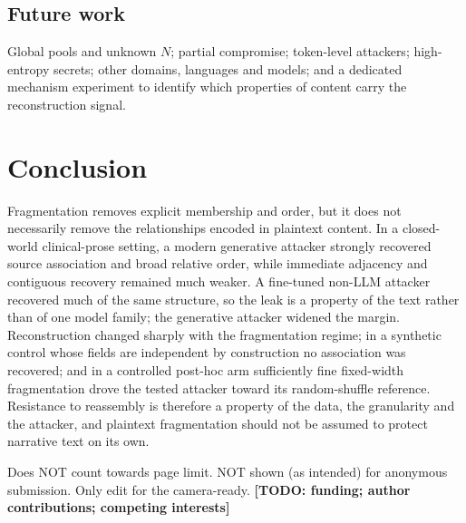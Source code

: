 \documentclass[sigconf,review]{acmart}
\newcommand{\TODO}[1]{\textbf{[TODO: #1]}}
\begin{document}
\subsection{Future work}
Global pools and unknown $N$; partial compromise; token-level attackers;
high-entropy secrets; other domains, languages and models; and a dedicated
mechanism experiment to identify which properties of content carry the
reconstruction signal.

\section{Conclusion}
\label{sec:conclusion}
Fragmentation removes explicit membership and order, but it does not
necessarily remove the relationships encoded in plaintext content. In a
closed-world clinical-prose setting, a modern generative attacker strongly
recovered source association and broad relative order, while immediate
adjacency and contiguous recovery remained much weaker. A fine-tuned non-LLM
attacker recovered much of the same structure, so the leak is a property of the
text rather than of one model family; the generative attacker widened the
margin. Reconstruction changed
sharply with the fragmentation regime; in a synthetic control whose fields are
independent by construction no association was recovered; and in a controlled
post-hoc arm sufficiently fine fixed-width fragmentation drove the tested
attacker toward its random-shuffle reference. Resistance to reassembly is
therefore a property of the data, the granularity and the attacker, and
plaintext fragmentation should not be assumed to protect narrative text on its
own.

\begin{acks}
Does NOT count towards page limit. NOT shown (as intended) for anonymous
submission. Only edit for the camera-ready. \TODO{funding; author
contributions; competing interests}
\end{acks}
\end{document}
